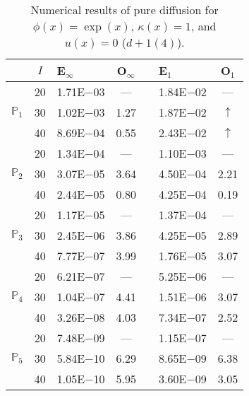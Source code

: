 \begin{table}[H]
\centering
\caption{Numerical results of pure diffusion for $\phi(x)=\exp(x)$, $\kappa(x)=1$, and $u(x)=0$ ($d+1(4)$).}
\begin{tabular}{@{}l c l c c l c@{}}
\toprule
 & $I$ & E$_{\infty}$ & O$_{\infty}$ && E$_1$ & O$_1$\\
\midrule
\multirow{3}{*}{$\mathbb{P}_{1}$}
 & 20 & 1.71E$-$03 & --- && 1.84E$-$02 & ---\\
 & 30 & 1.02E$-$03 & 1.27 && 1.87E$-$02 & $\uparrow$\\
 & 40 & 8.69E$-$04 & 0.55 && 2.43E$-$02 & $\uparrow$\\
\midrule
\multirow{3}{*}{$\mathbb{P}_{2}$}
 & 20 & 1.34E$-$04 & --- && 1.10E$-$03 & ---\\
 & 30 & 3.07E$-$05 & 3.64 && 4.50E$-$04 & 2.21\\
 & 40 & 2.44E$-$05 & 0.80 && 4.25E$-$04 & 0.19\\
\midrule
\multirow{3}{*}{$\mathbb{P}_{3}$}
 & 20 & 1.17E$-$05 & --- && 1.37E$-$04 & ---\\
 & 30 & 2.45E$-$06 & 3.86 && 4.25E$-$05 & 2.89\\
 & 40 & 7.77E$-$07 & 3.99 && 1.76E$-$05 & 3.07\\
\midrule
\multirow{3}{*}{$\mathbb{P}_{4}$}
 & 20 & 6.21E$-$07 & --- && 5.25E$-$06 & ---\\
 & 30 & 1.04E$-$07 & 4.41 && 1.51E$-$06 & 3.07\\
 & 40 & 3.26E$-$08 & 4.03 && 7.34E$-$07 & 2.52\\
\midrule
\multirow{3}{*}{$\mathbb{P}_{5}$}
 & 20 & 7.48E$-$09 & --- && 1.15E$-$07 & ---\\
 & 30 & 5.84E$-$10 & 6.29 && 8.65E$-$09 & 6.38\\
 & 40 & 1.05E$-$10 & 5.95 && 3.60E$-$09 & 3.05\\
\bottomrule
\end{tabular}
\end{table}